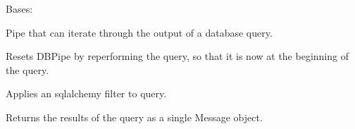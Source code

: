 \documentclass[letterpaper,10pt,english]{sphinxmanual}
\begin{document}
\begin{fulllineitems}
\label{\detokenize{Fireworks:Fireworks.extensions.database.DBPipe}}
Bases: {\hyperref[\detokenize{Fireworks:Fireworks.core.pipe.Pipe}]{}}

Pipe that can iterate through the output of a database query.

\begin{fulllineitems}
\label{\detokenize{Fireworks:Fireworks.extensions.database.DBPipe.reset}}
Resets DBPipe by reperforming the query, so that it is now at the beginning of the query.

\end{fulllineitems}


\begin{fulllineitems}
\label{\detokenize{Fireworks:Fireworks.extensions.database.DBPipe.filter}}
Applies an sqlalchemy filter to query.

\end{fulllineitems}


\begin{fulllineitems}
\label{\detokenize{Fireworks:Fireworks.extensions.database.DBPipe.all}}
Returns the results of the query as a single Message object.

\end{fulllineitems}


\begin{fulllineitems}
\label{\detokenize{Fireworks:Fireworks.extensions.database.DBPipe.delete}}
\end{fulllineitems}


\end{fulllineitems}
\end{document}
